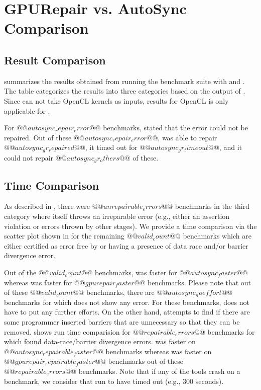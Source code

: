 \section{GPURepair vs. AutoSync Comparison}

\subsection{Result Comparison}
 summarizes the results obtained from running the benchmark suite with \tool and \autosync. The table categorizes the results into three categories based on the output of \verifier. Since \autosync can not take OpenCL kernels as inputs, results for OpenCL is only applicable for \tool.

For $@@autosync_repair_error@@$ benchmarks, \autosync stated that the error could not be repaired. Out of these $@@autosync_repair_error@@$, \tool was able to repair $@@autosync_gr_repaired@@$, it timed out for $@@autosync_gr_timeout@@$, and it could not repair $@@autosync_gr_others@@$ of these.



\subsection{Time Comparison}
As described in , there were $@@unrepairable_errors@@$ benchmarks in the third category where \verifier itself throws an irreparable error (e.g., either an assertion violation or errors thrown by other stages). We provide a time comparison via the scatter plot shown in  for the remaining $@@valid_count@@$ benchmarks which are either certified as error free by \verifier or having a presence of data race and/or barrier divergence error.

Out of the $@@valid_count@@$ benchmarks, \autosync was faster for $@@autosync_faster@@$ whereas \tool was faster for $@@gpurepair_faster@@$ benchmarks. Please note that out of these $@@valid_count@@$ benchmarks, there are $@@autosync_noeffort@@$ benchmarks for which \verifier does not show any error. For these benchmarks, \autosync does not have to put any further efforts. On the other hand, \tool attempts to find if there are some programmer inserted barriers that are unnecessary so that they can be removed.  shows run time comparision for $@@repairable_errors@@$ benchmarks for which \verifier found data-race/barrier divergence errors. \autosync was faster on $@@autosync_repairable_faster@@$ benchmarks whereas \tool was faster on $@@gpurepair_repairable_faster@@$ benchmarks out of these $@@repairable_errors@@$ benchmarks. Note that if any of the tools crash on a benchmark, we consider that run to have timed out (e.g., $300$ seconds).

